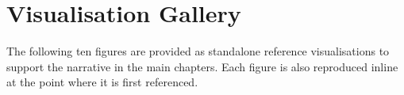 \documentclass[12pt, a4paper, twoside, openright]{book}
\theoremstyle{plain}
\theoremstyle{definition}
\begin{document}
\setlength{\parskip}{0.5\baselineskip}
\setlength{\parindent}{0pt}

\frontmatter




\tableofcontents
\listoffigures
\listoftables
\lstlistoflistings

\mainmatter













\appendix
\chapter{Visualisation Gallery}
\label{app:figures}

The following ten figures are provided as standalone reference visualisations
to support the narrative in the main chapters.  Each figure is also
reproduced inline at the point where it is first referenced.



\backmatter
\printbibliography[heading=bibintoc, title={Bibliography}]
\end{document}
